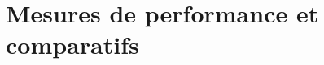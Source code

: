 			\begin{frame}
		
			\end{frame}
			
			\begin{frame}
		
			\end{frame}	
		
	\section{Mesures de performance et comparatifs}	
		\begin{frame}
	
		\end{frame}
		
		\begin{frame}
	
		\end{frame}
		
		\begin{frame}
	
		\end{frame}
	

